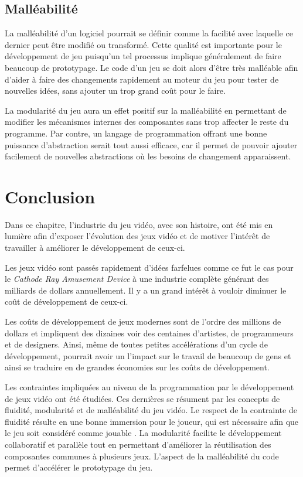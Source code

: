 \documentclass[12pt,oneside,letterpaper,francais]{book}
\begin{document}
\subsection{Malléabilité}

La malléabilité d'un logiciel pourrait se définir comme la facilité
avec laquelle ce dernier peut être modifié ou transformé. Cette
qualité est importante pour le développement de jeu puisqu'un tel
processus implique généralement de faire beaucoup de prototypage. Le
code d'un jeu se doit alors d'être très malléable afin d'aider à faire
des changements rapidement au moteur du jeu pour tester de nouvelles
idées, sans ajouter un trop grand coût pour le faire.

La modularité du jeu aura un effet positif sur la malléabilité en
permettant de modifier les mécanismes internes des composantes sans
trop affecter le reste du programme. Par contre, un langage de
programmation offrant une bonne puissance d'abstraction serait tout
aussi efficace, car il permet de pouvoir ajouter facilement de
nouvelles abstractions où les besoins de changement apparaissent.


\section{Conclusion}
Dans ce chapitre, l'industrie du jeu vidéo, avec son histoire, ont été
mis en lumière afin d'exposer l'évolution des jeux vidéo et de motiver
l'intérêt de travailler à améliorer le développement de ceux-ci.

Les jeux vidéo sont passés rapidement d'idées farfelues comme ce fut
le cas pour le \textit{Cathode Ray Amusement Device} à une industrie
complète générant des milliards de dollars annuellement. Il y a un
grand intérêt à vouloir diminuer le coût de développement de
ceux-ci. 

Les coûts de développement de jeux modernes sont de l'ordre des
millions de dollars et impliquent des dizaines voir des centaines
d'artistes, de programmeurs et de designers. Ainsi, même de toutes
petites accélérations d'un cycle de développement, pourrait avoir un
l'impact sur le travail de beaucoup de gens et ainsi se traduire en
de grandes économies sur les coûts de développement.

Les contraintes impliquées au niveau de la programmation par le
développement de jeux vidéo ont été étudiées. Ces dernières se
résument par les concepts de fluidité, modularité et de malléabilité
du jeu vidéo. Le respect de la contrainte de fluidité résulte en une
bonne immersion pour le joueur, qui est nécessaire afin que le jeu
soit considéré comme \og jouable \fg. La modularité facilite le
développement collaboratif et parallèle tout en permettant d'améliorer
la réutilisation des composantes communes à plusieurs jeux. L'aspect
de la malléabilité du code permet d'accélérer le prototypage du jeu.
\end{document}
